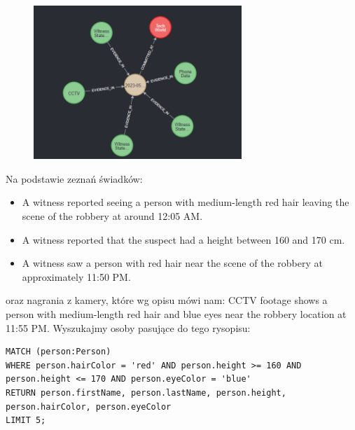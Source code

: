 \documentclass[a4paper,12pt]{article}
\begin{document}
\begin{figure}[h!]
    \centering
    \includegraphics[width=0.7\textwidth]{robbery.png} 
\end{figure}

\newpage
Na podstawie zeznań świadków:

\begin{itemize}
    \item A witness reported seeing a person with medium-length red hair leaving the scene of the robbery at around 12:05 AM.
    \item A witness reported that the suspect had a height between 160 and 170 cm.
    \item A witness saw a person with red hair near the scene of the robbery at approximately 11:50 PM.
\end{itemize}

oraz nagrania z kamery, które wg opisu mówi nam: CCTV footage shows a person with medium-length red hair and blue eyes near the robbery location at 11:55 PM.
\newline
\newline Wyszukajmy osoby pasujące do tego rysopisu:

\begin{center}
\begin{minipage}{0.8\linewidth}
\begin{lstlisting}[language=Cypher, basicstyle=\small, breaklines=true]
MATCH (person:Person)
WHERE person.hairColor = 'red' AND person.height >= 160 AND person.height <= 170 AND person.eyeColor = 'blue'
RETURN person.firstName, person.lastName, person.height, person.hairColor, person.eyeColor
LIMIT 5;
\end{lstlisting}
\end{minipage}
\end{center}
\end{document}

